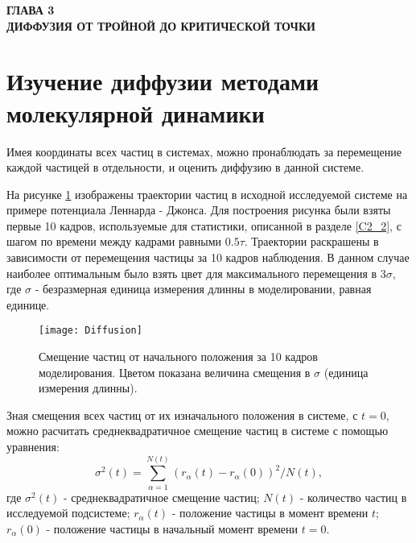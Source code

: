 \newpage
\begin{center}
\textbf{ГЛАВА 3}\\
\textbf{ДИФФУЗИЯ ОТ ТРОЙНОЙ ДО КРИТИЧЕСКОЙ ТОЧКИ}
\end{center}




\section{Изучение диффузии методами молекулярной динамики}\label{C3_1}

Имея координаты всех частиц в системах, можно пронаблюдать за перемещение каждой частицей в отдельности, и оценить диффузию в данной системе.

На рисунке \ref{risTreck} изображены траектории частиц в  исходной исследуемой системе на примере потенциала Леннарда - Джонса. Для построения рисунка были взяты первые 10 кадров, используемые для статистики, описанной в разделе \ref{C2_2}, с шагом по времени между кадрами равными $0.5\tau$. Траектории раскрашены в зависимости от перемещения частицы за 10 кадров наблюдения. В данном случае наиболее оптимальным было взять цвет для максимального перемещения в $3\sigma$, где $\sigma$ - безразмерная единица измерения длинны в моделировании, равная единице. 

\begin{figure}[htbp!]
\begin{center}
\texttt{[image: Diffusion]}
\caption{Смещение частиц от начального положения за 10 кадров моделирования. Цветом показана величина смещения в $\sigma$ (единица измерения длинны).}
\label{risTreck}
\end{center}
\end{figure}

Зная смещения всех частиц от их изначального положения в системе, с $t = 0$, можно расчитать среднеквадратичное смещение частиц в системе с помощью уравнения:
\begin{equation}
    \sigma^2(t) = \sum\limits_{\alpha = 1}^{N(t)} (r_{\alpha}(t) - r_{\alpha}(0))^2 / N(t),
    \label{eqRMS}
\end{equation}
где $\sigma^2(t)$ - среднеквадратичное смещение частиц; $N(t)$ - количество частиц в исследуемой подсистеме; $r_{\alpha}(t)$ - положение частицы в момент времени $t$; $r_{\alpha}(0)$ - положение частицы в начальный момент времени $t = 0$.

